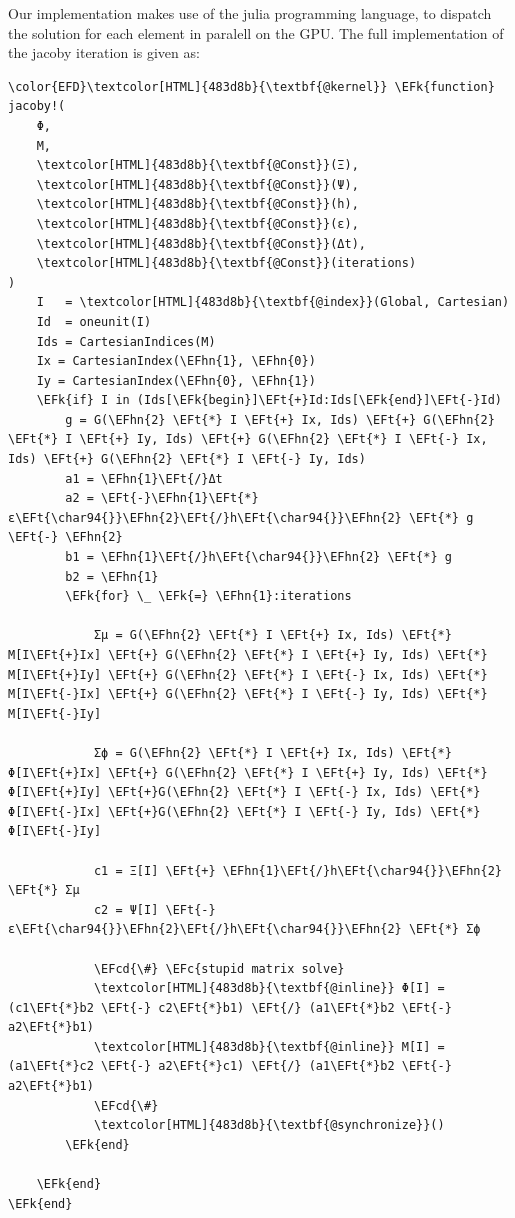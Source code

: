 \documentclass{mimosis}
\newcommand{\EFc}[1]{\textcolor{EFc}{#1}} %
\newcommand{\EFcd}[1]{\textcolor{EFcd}{#1}} %
\newcommand{\EFk}[1]{\textcolor{EFk}{#1}} %
\newcommand{\EFt}[1]{\textcolor{EFt}{#1}} %
\newcommand{\EFhn}[1]{\textcolor{EFhn}{#1}} %
\begin{document}
Our implementation makes use of the julia programming language, to dispatch the solution for each element in paralell on the GPU. The full implementation of the jacoby iteration is given as:
\begin{Code}
\begin{Verbatim}
\color{EFD}\textcolor[HTML]{483d8b}{\textbf{@kernel}} \EFk{function} jacoby!(
    Φ,
    M,
    \textcolor[HTML]{483d8b}{\textbf{@Const}}(Ξ),
    \textcolor[HTML]{483d8b}{\textbf{@Const}}(Ψ),
    \textcolor[HTML]{483d8b}{\textbf{@Const}}(h),
    \textcolor[HTML]{483d8b}{\textbf{@Const}}(ε),
    \textcolor[HTML]{483d8b}{\textbf{@Const}}(Δt),
    \textcolor[HTML]{483d8b}{\textbf{@Const}}(iterations)
)
    I   = \textcolor[HTML]{483d8b}{\textbf{@index}}(Global, Cartesian)
    Id  = oneunit(I)
    Ids = CartesianIndices(M)
    Ix = CartesianIndex(\EFhn{1}, \EFhn{0})
    Iy = CartesianIndex(\EFhn{0}, \EFhn{1})
    \EFk{if} I in (Ids[\EFk{begin}]\EFt{+}Id:Ids[\EFk{end}]\EFt{-}Id)
        g = G(\EFhn{2} \EFt{*} I \EFt{+} Ix, Ids) \EFt{+} G(\EFhn{2} \EFt{*} I \EFt{+} Iy, Ids) \EFt{+} G(\EFhn{2} \EFt{*} I \EFt{-} Ix, Ids) \EFt{+} G(\EFhn{2} \EFt{*} I \EFt{-} Iy, Ids)
        a1 = \EFhn{1}\EFt{/}Δt
        a2 = \EFt{-}\EFhn{1}\EFt{*} ε\EFt{\char94{}}\EFhn{2}\EFt{/}h\EFt{\char94{}}\EFhn{2} \EFt{*} g  \EFt{-} \EFhn{2}
        b1 = \EFhn{1}\EFt{/}h\EFt{\char94{}}\EFhn{2} \EFt{*} g
        b2 = \EFhn{1}
        \EFk{for} \_ \EFk{=} \EFhn{1}:iterations

            Σμ = G(\EFhn{2} \EFt{*} I \EFt{+} Ix, Ids) \EFt{*} M[I\EFt{+}Ix] \EFt{+} G(\EFhn{2} \EFt{*} I \EFt{+} Iy, Ids) \EFt{*} M[I\EFt{+}Iy] \EFt{+} G(\EFhn{2} \EFt{*} I \EFt{-} Ix, Ids) \EFt{*} M[I\EFt{-}Ix] \EFt{+} G(\EFhn{2} \EFt{*} I \EFt{-} Iy, Ids) \EFt{*} M[I\EFt{-}Iy]

            Σϕ = G(\EFhn{2} \EFt{*} I \EFt{+} Ix, Ids) \EFt{*} Φ[I\EFt{+}Ix] \EFt{+} G(\EFhn{2} \EFt{*} I \EFt{+} Iy, Ids) \EFt{*} Φ[I\EFt{+}Iy] \EFt{+}G(\EFhn{2} \EFt{*} I \EFt{-} Ix, Ids) \EFt{*} Φ[I\EFt{-}Ix] \EFt{+}G(\EFhn{2} \EFt{*} I \EFt{-} Iy, Ids) \EFt{*} Φ[I\EFt{-}Iy]

            c1 = Ξ[I] \EFt{+} \EFhn{1}\EFt{/}h\EFt{\char94{}}\EFhn{2}   \EFt{*} Σμ
            c2 = Ψ[I] \EFt{-} ε\EFt{\char94{}}\EFhn{2}\EFt{/}h\EFt{\char94{}}\EFhn{2} \EFt{*} Σϕ

            \EFcd{\#} \EFc{stupid matrix solve}
            \textcolor[HTML]{483d8b}{\textbf{@inline}} Φ[I] = (c1\EFt{*}b2 \EFt{-} c2\EFt{*}b1) \EFt{/} (a1\EFt{*}b2 \EFt{-} a2\EFt{*}b1)
            \textcolor[HTML]{483d8b}{\textbf{@inline}} M[I] = (a1\EFt{*}c2 \EFt{-} a2\EFt{*}c1) \EFt{/} (a1\EFt{*}b2 \EFt{-} a2\EFt{*}b1)
            \EFcd{\#}
            \textcolor[HTML]{483d8b}{\textbf{@synchronize}}()
        \EFk{end}

    \EFk{end}
\EFk{end}
\end{Verbatim}
\end{Code}
\end{document}
